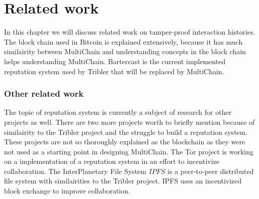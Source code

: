 \chapter{Related work}
In this chapter we will discuss related work on tamper-proof interaction histories.
The block chain used in Bitcoin is explained extensively,
because it has much similairity between MultiChain and understanding concepts in the block chain helps understanding MultiChain.
Bartercast is the current implemented reputation system used by Tribler that will be replaced by MultiChain.





\subsection{Other related work}
The topic of reputation system is currently a subject of research for other projects as well.
There are two more projects worth to briefly mention because of similairity to the Tribler project
and the struggle to build a reputation system.
These projects are not so thoroughly explained as the blockchain
as they were not used as a starting point in designing MultiChain.
The Tor project is working on a implementation of a reputation system
in an effort to incentivize collaboration\cite{androulaki-torincentive}\cite{chen-torincentive}\cite{dingledine-torincentive}\cite{ghosh-torincentive}\cite{jansen-torincentive}.
The InterPlanetary File System \(IPFS\) is a peer-to-peer distributed file system with similairities to the Tribler project.
IPFS uses an incentivized block exchange to improve collaboration\cite{benet-ipfs}.